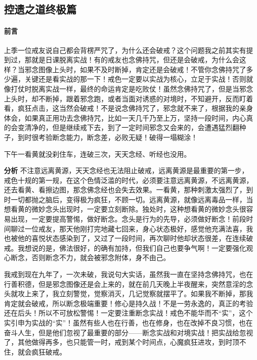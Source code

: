 \subsection{控遗之道终极篇}

\paragraph*{前言}

上季一位戒友说自己都会背楞严咒了，为什么还会破戒？这个问题我之前其实有提到过，那就是日课脱离实战！有的戒友也念佛持咒，但还是会破戒，为什么会这样？当邪念图像上头时，如果不及时断掉，肯定还是会破戒！不管你念佛持咒了多少遍，关键还是看实战的那一下！戒色一定要以实战为核心，立足于实战！否则就像打仗时脱离实战一样，最终的命运肯定是吃败仗！虽然念佛持咒了，但是当邪念上头时，却不断掉，跟着邪念跑，或者当面对诱惑的对境时，不知避开，反而盯着看，疯狂点击，这当然会破戒！不是说念佛持咒了，邪念就不来了，根据我的亲身体会，如果真正用功去念佛持咒，比如一天几千乃至上万，坚持一段时间，内心真的会变清净的，但是继续戒下去，到了一定时间邪念又会来的，会遭遇猛烈翻种子，到时很考验断念能力，断念差，必败无疑！破得一塌糊涂！

\begin{case}
    下午一看黄就没刹住车，连破三次，天天念经、听经也没用。

    \textbf{分析} 不注意远离黄源，天天念经也无法阻止破戒，远离黄源是最重要的第一步，戒色十规的第一规，在这个色情泛滥的时代，必须要注意远离黄源，不远离黄源，还去看黄、看擦边图，那念佛念经也会失去效果。一看黄，那种刺激太强烈了，到时一切都抛之脑后，变得极为疯狂，不顾一切。远离黄源，就像远离毒品一样，当想看黄的微妙念头出现时，一定要立刻断除。独处时，这种想看黄的微妙念头很容易出现，一定要提高警惕，做好断念。念头是行为的先导，必须做好断念！前段时间聊过一位戒友，那天他刚打完地藏七回来，身心状态极好，感觉他充满法喜，我也被他的喜悦状态感染到了，又过了一段时间，再次聊时他却状态很差，在连续破戒。我想说的是，佛法很好，的确有加持，但我们自己也要争气啊！一定要强化观心断念，否则断念不力，就会被邪念附体，身不由己。
\end{case}

我戒到现在九年了，一次未破，我说句大实话，虽然我一直在坚持念佛持咒，也在行善积德，但是邪念图像还是会上来的，就在前几天晚上半夜醒来，突然意淫的念头就攻上来了，我立刻警觉，觉察消灭，几记觉察就摆平了。如果我不断掉，那我肯定就会破戒，所以断念极端重要！修心是持久战！不是一劳永逸的，真正的考验还在后头！所以不可放松警惕！一定要注重断念实战！戒色不能华而不“实”，这个实引申为实战的“实”！虽然有些人也在行善，也在修身，也在改掉不良习惯，也在奋斗人生，但是他们忽视了最重要的部分——断念实战和对境实战！把实战给忽视了，其他做得再多，也只能管一时，戒到某个时间点，心魔疯狂进攻，到时顶不住，就会疯狂破戒。

